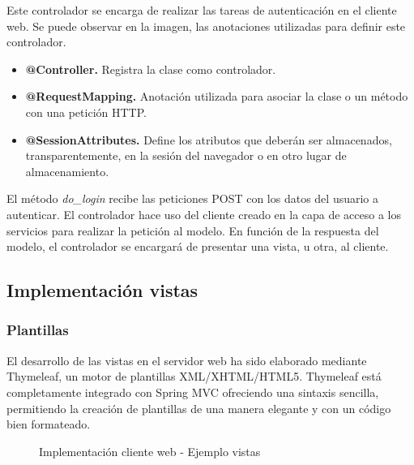 Este controlador se encarga de realizar las tareas de autenticación en el cliente web. Se puede observar en la imagen, las anotaciones utilizadas para definir este controlador.

\begin{itemize}
	\item \textbf{@Controller. }Registra la clase como controlador.
	\item \textbf{@RequestMapping. }Anotación utilizada para asociar la clase o un método con una petición HTTP.
	\item \textbf{@SessionAttributes. }Define los atributos que deberán ser almacenados, transparentemente, en la sesión del navegador o en otro lugar de almacenamiento.
\end{itemize}

El método \textit{do\_login} recibe las peticiones POST con los datos del usuario a autenticar. El controlador hace uso del cliente creado en la capa de acceso a los servicios para realizar la petición al modelo. En función de la respuesta del modelo, el controlador se encargará de presentar una vista, u otra, al cliente.


\subsection{Implementación vistas}

\subsubsection*{Plantillas}

El desarrollo de las vistas en el servidor web ha sido elaborado mediante Thymeleaf, un motor de plantillas XML/XHTML/HTML5. Thymeleaf está completamente integrado con Spring MVC ofreciendo una sintaxis sencilla, permitiendo  la creación de plantillas de una manera elegante y con un código bien formateado.

\begin{figure}[H]
\centering
{}
\caption{Implementación cliente web - Ejemplo vistas}
\end{figure}

